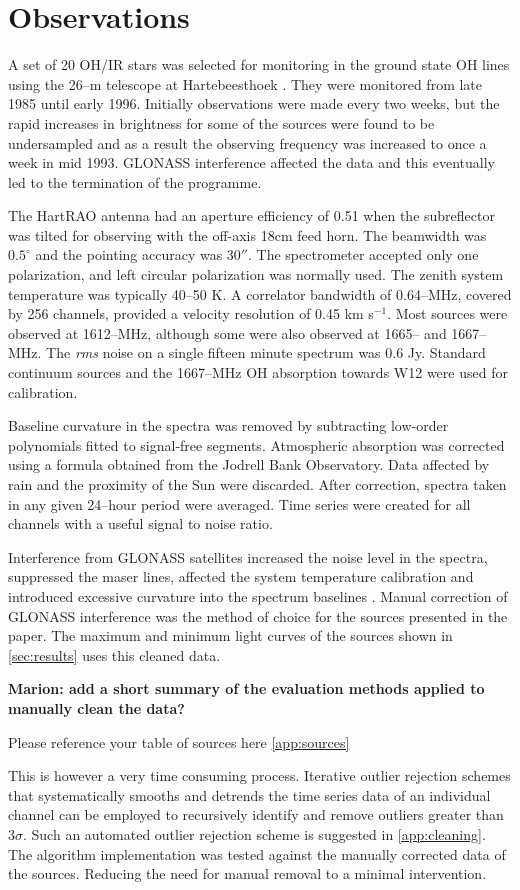 \section{Observations}
\label{sec:observations}

A set of 20 OH/IR stars was selected for monitoring in the ground state OH lines using the 26--m telescope at Hartebeesthoek
\citep{West98}.
They were monitored from late 1985 until early 1996.
Initially observations were made every two weeks, but the rapid increases in brightness for some of the sources were found to be undersampled and as a result the observing frequency was increased to once a week in mid 1993.
GLONASS interference affected the data
\citep{ComWestGay94}
and this eventually led to the termination of the programme.

The HartRAO antenna had an aperture efficiency of 0.51 when the subreflector was tilted for observing with the off-axis 18cm feed horn.
The beamwidth was $0.5^\circ$ and the pointing accuracy was $30''$.
The spectrometer accepted only one polarization, and left circular
polarization was normally used.  The zenith system temperature was typically 40--50 K.
A correlator bandwidth of 0.64--MHz, covered by 256 channels, provided a velocity resolution of 0.45 km s$^{-1}$.
Most sources were observed at 1612--MHz, although some were also observed at 1665-- and 1667--MHz.
The {\em rms\/} noise on a single fifteen minute spectrum was 0.6 Jy.
Standard continuum sources
\citep{Ott94}
and the 1667--MHz OH absorption towards W12 were used for calibration.

Baseline curvature in the spectra was removed by subtracting low-order polynomials fitted to signal-free segments.
Atmospheric absorption was corrected using a formula obtained from the Jodrell Bank Observatory.
Data affected by rain and the proximity of the Sun were discarded.
After correction, spectra taken in any given 24--hour period were averaged.
Time series were created for all channels with a useful signal to noise ratio.

Interference from GLONASS satellites increased the noise level in the spectra, suppressed the maser lines, affected the system temperature calibration and introduced excessive curvature into the spectrum baselines
\citep{ComWestGay94}.
Manual correction of GLONASS interference
\citep{West98}
was the method of choice for the sources presented in the paper.
The maximum and minimum light curves of the sources shown in \cref{sec:results} uses this cleaned data.
{\color{red}
\textbf{Marion: add a short summary of the evaluation methods applied to manually clean the data?}

Please reference your table of sources here \cref{app:sources}
}

This is however a very time consuming process.
Iterative outlier rejection schemes that systematically smooths and detrends the time series data of an individual channel can be employed to recursively identify and remove outliers greater than 3$\sigma$.
Such an automated outlier rejection scheme is suggested in \cref{app:cleaning}.
The algorithm implementation was tested against the manually corrected data of the sources.
Reducing the need for manual removal to a minimal intervention.
